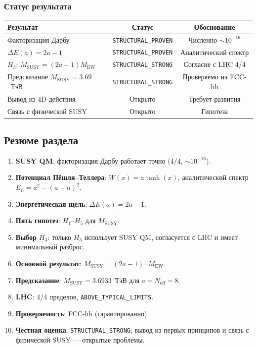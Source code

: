 \documentclass[11pt,a4paper]{article}
\theoremstyle{definition}
\begin{document}
\subsubsection{Статус результата}

\begin{center}
\begin{tabular}{lcc}
\toprule
Результат & Статус & Обоснование \\
\midrule
Факторизация Дарбу & \texttt{STRUCTURAL\_PROVEN} &
Численно $\sim 10^{-16}$ \\
$\Delta E(a) = 2a-1$ & \texttt{STRUCTURAL\_PROVEN} &
Аналитический спектр \\
$H_3$: $M_{\text{SUSY}} = (2a-1) M_{\text{EW}}$ & \texttt{STRUCTURAL\_STRONG} &
Согласие с LHC 4/4 \\
Предсказание $M_{\text{SUSY}} = 3.69$~ТэВ & \texttt{STRUCTURAL\_STRONG} &
Проверяемо на FCC-hh \\
Вывод из 4D-действия & Открыто & Требует развития \\
Связь с физической SUSY & Открыто & Гипотеза \\
\bottomrule
\end{tabular}
\end{center}

\subsection{Резюме раздела}
\label{subsec:susy-summary}

\begin{enumerate}
    \item \textbf{SUSY QM}: факторизация Дарбу работает
          точно (4/4, $\sim 10^{-16}$).
    \item \textbf{Потенциал Пёшля--Теллера}:
          $W(x) = a \tanh(x)$, аналитический спектр
          $E_n = a^2 - (a-n)^2$.
    \item \textbf{Энергетическая щель}:
          $\Delta E(a) = 2a - 1$.
    \item \textbf{Пять гипотез}: $H_1$--$H_5$ для
          $M_{\text{SUSY}}$.
    \item \textbf{Выбор $H_3$}: только $H_3$ использует
          SUSY QM, согласуется с LHC и имеет минимальный
          разброс.
    \item \textbf{Основной результат}:
          $M_{\text{SUSY}} = (2a-1) \cdot M_{\text{EW}}$.
    \item \textbf{Предсказание}: $M_{\text{SUSY}} = 3.6933$~ТэВ
          для $a = N_{\text{eff}} = 8$.
    \item \textbf{LHC}: 4/4 пределов, \texttt{ABOVE\_TYPICAL\_LIMITS}.
    \item \textbf{Проверяемость}: FCC-hh (гарантированно).
    \item \textbf{Честная оценка}: \texttt{STRUCTURAL\_STRONG};
          вывод из первых принципов и связь с физической SUSY
          --- открытые проблемы.
\end{enumerate}
\end{document}
